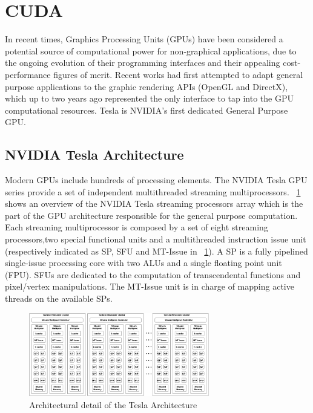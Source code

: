 \section{CUDA}
\label{sec:art_of_cuda}
   In recent times, Graphics Processing Units (GPUs) have been considered a potential source of computational
power for non-graphical applications, due to the ongoing evolution of their programming interfaces and their
appealing cost-performance figures of merit. Recent works had first attempted to adapt general purpose applications
to the graphic rendering APIs (OpenGL and DirectX), which up to two years ago represented the only interface to tap
into the GPU computational resources. Tesla is NVIDIA's first dedicated General Purpose GPU.
\newline
\subsection{NVIDIA Tesla Architecture}
   Modern GPUs include hundreds of processing elements. The NVIDIA Tesla GPU series provide a set
of independent multithreaded streaming multiprocessors. \figurename~\ref{fig:teslaarch} shows an overview of the NVIDIA
Tesla streaming processors array which is the part of the GPU architecture responsible for the general purpose computation.
Each streaming multiprocessor is composed by a set of eight streaming processors,two special functional units and a multithreaded
instruction issue unit (respectively indicated as SP, SFU and MT-Issue in \figurename~\ref{fig:teslaarch}).\newline
A SP is a fully pipelined single-issue processing core with two ALUs and a single floating point unit (FPU). 
SFUs are dedicated to the computation of transcendental functions and pixel/vertex manipulations.
The MT-Issue unit is in charge of mapping active threads on the available SPs.\newline

\begin{figure}[h!tp]
    \centering
     \includegraphics[width=0.7\textwidth]{./img/nvidiadetail}
\caption{Architectural detail of the Tesla Architecture}\label{fig:teslaarch}
    \end{figure}


